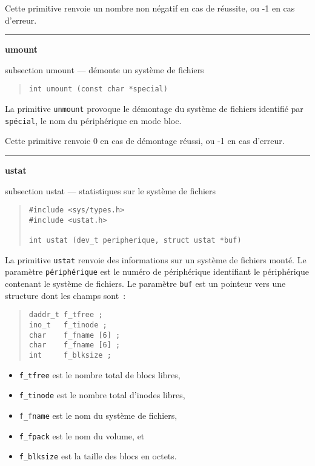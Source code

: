 \documentclass [twoside] {report}
\newcommand {\primitive} [1]
    {
	{\large \bf #1}
	\addcontentsline {toc} {subsection} {#1}
    }
\newcommand {\separation}
    {
	\vspace {7mm}
	\nopagebreak
	\hrule
    }
\begin{document}
Cette primitive renvoie un nombre non négatif en
cas de réussite, ou -1 en cas d'erreur.




\separation
\primitive {umount} --- démonte un système de fichiers

\begin {quote}
\begin {verbatim}
int umount (const char *special)
\end{verbatim}
\end {quote}

La primitive {\tt unmount} provoque le démontage du
système de fichiers identifié par {\tt spécial}, le nom du
périphérique en mode bloc.

Cette primitive renvoie 0 en cas de démontage
réussi, ou -1 en cas d'erreur.




\separation
\primitive {ustat} --- statistiques sur le système de fichiers

\begin {quote}
\begin {verbatim}
#include <sys/types.h>
#include <ustat.h>

int ustat (dev_t peripherique, struct ustat *buf)
\end{verbatim}
\end {quote}

La primitive {\tt ustat} renvoie des informations
sur un système de fichiers monté. Le paramètre
{\tt périphérique} est le numéro de périphérique
identifiant le périphérique contenant le système
de fichiers. Le paramètre {\tt buf} est un pointeur
vers une structure dont les champs sont~:

\begin {quote}
\begin {verbatim}
daddr_t f_tfree ;
ino_t   f_tinode ;
char    f_fname [6] ;
char    f_fname [6] ;
int     f_blksize ;
\end{verbatim}
\end {quote}

\begin {itemize}
    \item {\tt f\_tfree} est le nombre total de blocs libres,
    \item {\tt f\_tinode} est le nombre total d'inodes libres,
    \item {\tt f\_fname} est le nom du système de fichiers,
    \item {\tt f\_fpack} est le nom du volume, et
    \item {\tt f\_blksize} est la taille des blocs en octets.
\end {itemize}
\end{document}
